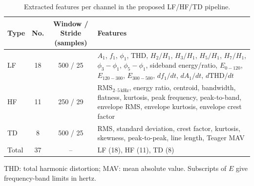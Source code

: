 \documentclass[letterpaper,journal]{IEEEtran}
\providecommand{\DIFaddend}{} %
\begin{document}
\begin{table}[p]
\begin{adjustbox}{max width=\textwidth,max totalheight=0.87\textheight}
\begin{minipage}{\textwidth}
\begin{minipage}[t]{0.48\textwidth}
\centering
\scriptsize
\caption{Extracted features per channel in the proposed LF/HF/TD pipeline.}
\label{tab:app_extracted_features}
\setlength{\tabcolsep}{3pt}
\renewcommand{\arraystretch}{1.08}
\begin{tabularx}{\columnwidth}{l c c X}
\hline
Type & No. & \shortstack{Window / Stride\\(samples)} & Features \\
\hline
LF & 18 & 500 / 25 &
$A_1$, $f_1$, $\phi_1$, THD, $H_2/H_1$, $H_3/H_1$, $H_5/H_1$, $H_7/H_1$,
$\phi_3-\phi_1$, $\phi_5-\phi_1$, sideband energy/ratio,
$E_{0-120}$, $E_{120-300}$, $E_{300-500}$,
$df_1/dt$, $dA_1/dt$, $d\mathrm{THD}/dt$ \\
\hline
HF & 11 & 250 / 29 &
$\mathrm{RMS}_{2\text{--}5\,\mathrm{kHz}}$, energy ratio, centroid, bandwidth, flatness, kurtosis,
peak frequency, peak-to-band, envelope RMS, envelope kurtosis, envelope crest factor \\
\hline
TD & 8 & 500 / 25 &
RMS, standard deviation, crest factor, kurtosis, skewness, peak-to-peak, line length, Teager MAV \\
\hline
Total & 37 & -- & LF (18), HF (11), TD (8) \\
\hline
\end{tabularx}
\par\smallskip\raggedright
THD: total harmonic distortion; MAV: mean absolute value. Subscripts of $E$ give frequency-band limits in hertz.

\end{minipage}
\end{minipage}
\end{adjustbox}
\end{table}
\DIFaddend
\end{document}
